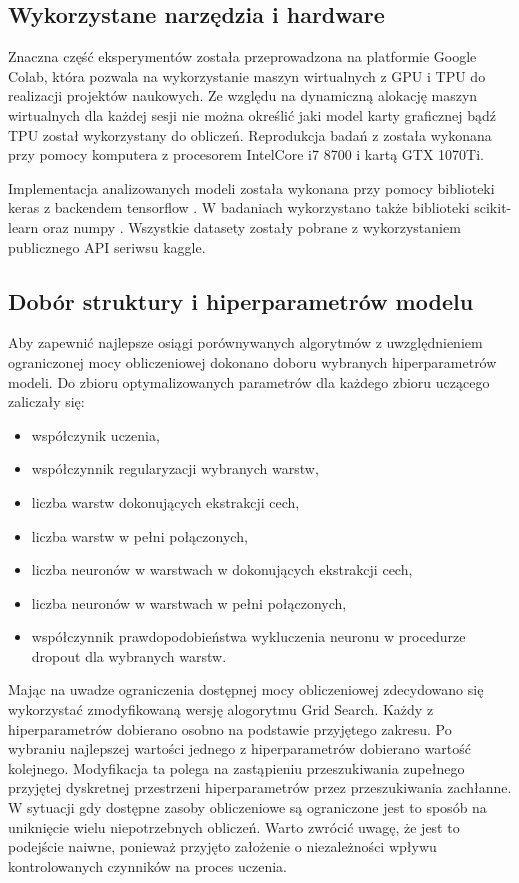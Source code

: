 \documentclass[oneside, mag]{mgr}
\begin{document}
\subsection{Wykorzystane narzędzia i hardware}

Znaczna część eksperymentów została przeprowadzona na platformie Google Colab, która pozwala na wykorzystanie maszyn wirtualnych z GPU i TPU do realizacji projektów naukowych. Ze względu na dynamiczną alokację maszyn wirtualnych dla każdej sesji nie można określić jaki model karty graficznej bądź TPU został wykorzystany do obliczeń. Reprodukcja badań z \cite{DBLP:journals/corr/VisinKCMCB15} została wykonana przy pomocy komputera z procesorem IntelCore i7 8700 i kartą GTX 1070Ti.

Implementacja analizowanych modeli została wykonana przy pomocy biblioteki keras \cite{keras} z backendem tensorflow \cite{tensorflow}. W badaniach wykorzystano także biblioteki scikit-learn \cite{scikit-learn} oraz numpy \cite{numpy}. Wszystkie datasety zostały pobrane z wykorzystaniem publicznego API seriwsu kaggle.

\subsection{Dobór struktury i hiperparametrów modelu}

Aby zapewnić najlepsze osiągi porównywanych algorytmów z uwzględnieniem ograniczonej mocy obliczeniowej dokonano doboru wybranych hiperparametrów modeli. Do zbioru optymalizowanych parametrów dla każdego zbioru uczącego zaliczały się:

\begin{itemize}
\item współczynik uczenia,
\item współczynnik regularyzacji wybranych warstw,
\item liczba warstw dokonujących ekstrakcji cech,
\item liczba warstw w pełni połączonych,
\item liczba neuronów w warstwach w dokonujących ekstrakcji cech,
\item liczba neuronów w warstwach w pełni połączonych,
\item współczynnik prawdopodobieństwa wykluczenia neuronu w procedurze dropout dla wybranych warstw.
\end{itemize}

Mając na uwadze ograniczenia dostępnej mocy obliczeniowej zdecydowano się wykorzystać zmodyfikowaną wersję alogorytmu Grid Search. Każdy z hiperparametrów dobierano osobno na podstawie przyjętego zakresu. Po wybraniu najlepszej wartości jednego z hiperparametrów dobierano wartość kolejnego. Modyfikacja ta polega na zastąpieniu przeszukiwania zupełnego przyjętej dyskretnej przestrzeni hiperparametrów przez przeszukiwania zachłanne. W sytuacji gdy dostępne zasoby obliczeniowe są ograniczone jest to sposób na uniknięcie wielu niepotrzebnych obliczeń. Warto zwrócić uwagę, że jest to podejście naiwne, ponieważ przyjęto założenie o niezależności wpływu kontrolowanych czynników na proces uczenia.
\end{document}
